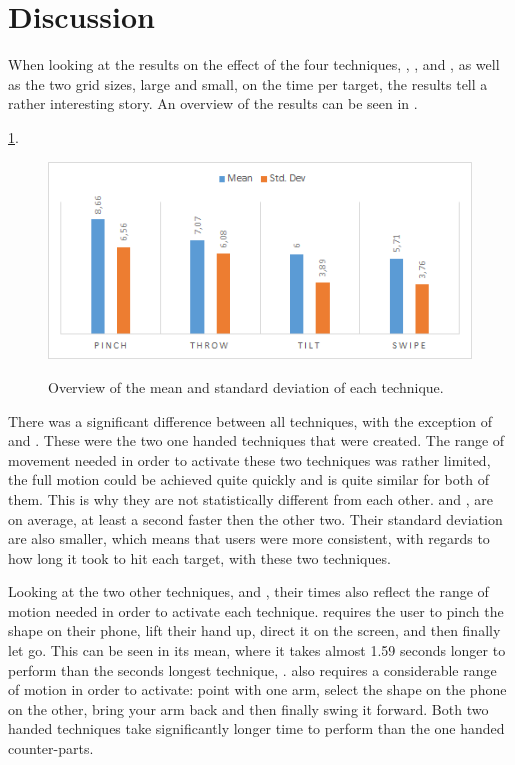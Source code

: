\section{Discussion}
\label{sec:discussion}

When looking at the results on the effect of the four techniques, \pinch, \tilt, \swipe and \throw, as well as the two grid sizes, large and small, on the time per target, the results tell a rather interesting story. An overview of the results can be seen in .

\ref{fig:timeResults}. 
\begin{figure}[H]
	{\includegraphics[width = 1\columnwidth ]{images/timeResults.png}} 
	\caption{
		Overview of the mean and standard deviation of each technique.
	}
	\label{fig:timeResults}
\end{figure}

There was a significant difference between all techniques, with the exception of \swipe and \tilt. These were the two one handed techniques that were created. The range of movement needed in order to activate these two techniques was rather limited, the full motion could be achieved quite quickly and is quite similar for both of them.  This is why they are not statistically different from each other. \swipe and \tilt, are on average, at least a second faster then the other two. Their standard deviation are also smaller, which means that users were more consistent, with regards to how long it took to hit each target, with these two techniques. 

Looking at the two other techniques, \pinch and \throw, their times also reflect the range of motion needed in order to activate each technique. \pinch requires the user to pinch the shape on their phone, lift their hand up, direct it on the screen, and then finally let go. This can be seen in its mean, where it takes almost 1.59 seconds longer to perform than the seconds longest technique, \throw. \throw also requires a considerable range of motion in order to activate: point with one arm, select the shape on the phone on the other, bring your arm back and then finally swing it forward. Both two handed techniques take significantly longer time to perform than the one handed counter-parts. 


